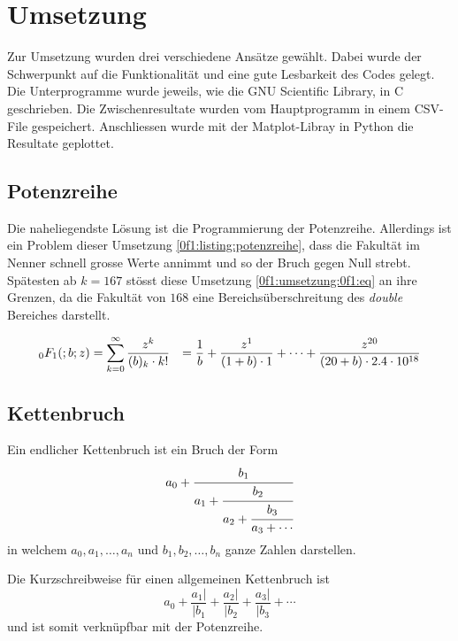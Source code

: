 %
%
%
\section{Umsetzung
\label{0f1:section:teil2}}
Zur Umsetzung wurden drei verschiedene Ansätze gewählt. Dabei wurde der Schwerpunkt auf die Funktionalität und eine gute Lesbarkeit des Codes gelegt.
Die Unterprogramme wurde jeweils, wie die GNU Scientific Library, in C geschrieben. Die Zwischenresultate wurden vom Hauptprogramm in einem CSV-File gespeichert. Anschliessen wurde mit der Matplot-Libray in Python die Resultate geplottet.

\subsection{Potenzreihe
\label{0f1:subsection:potenzreihe}}
Die naheliegendste Lösung ist die Programmierung der Potenzreihe. Allerdings ist ein Problem dieser Umsetzung \ref{0f1:listing:potenzreihe}, dass die Fakultät im Nenner schnell grosse Werte annimmt und so der Bruch gegen Null strebt. Spätesten ab $k=167$ stösst diese Umsetzung  \eqref{0f1:umsetzung:0f1:eq} an ihre Grenzen, da die Fakultät von $168$ eine Bereichsüberschreitung des \textit{double} Bereiches darstellt. \cite{0f1:double}

\begin{align}
    \label{0f1:umsetzung:0f1:eq}
    \mathstrut_0F_1(;b;z)
    &=
    \sum_{k=0}^\infty
    \frac{z^k}{(b)_k \cdot k!}
    &= 
    \frac{1}{b}
    +\frac{z^1}{(1+b) \cdot 1}
    + \cdots
    + \frac{z^{20}}{(20+b) \cdot 2.4 \cdot 10^{18}}
\end{align}



\subsection{Kettenbruch
\label{0f1:subsection:kettenbruch}}
Ein endlicher Kettenbruch ist ein Bruch der Form
\begin{equation*}
a_0 + \cfrac{b_1}{a_1+\cfrac{b_2}{a_2+\cfrac{b_3}{a_3+\cdots}}}
\end{equation*}
in welchem $a_0, a_1,\dots,a_n$ und $b_1,b_2,\dots,b_n$ ganze Zahlen darstellen.

Die Kurzschreibweise für einen allgemeinen Kettenbruch ist 
\begin{equation*}
	a_0 + \frac{a_1|}{|b_1} + \frac{a_2|}{|b_2} + \frac{a_3|}{|b_3} + \cdots
\end{equation*}
und ist somit verknüpfbar mit der Potenzreihe.
\cite{0f1:wiki-kettenbruch}

